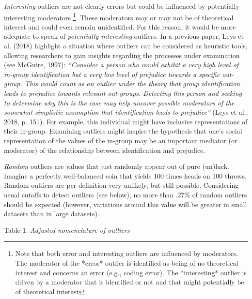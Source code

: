 \documentclass[man,floatsintext]{apa6}
\let\rmarkdownfootnote\footnote%
\def\footnote{\protect\rmarkdownfootnote}
\begin{document}
\emph{Interesting} outliers are not clearly errors but could be influenced by potentially interesting moderators \footnote{Note that both error and interesting outliers are influenced by moderators. The moderator of the *error* outlier is identified as being of no theoretical interest and concerns an error (e.g., coding error). The *interesting* outlier is driven by a moderator that is identified or not and that might potentially be of theoretical interest}. These moderators may or may not be of theoretical interest and could even remain unidentified. For this reason, it would be more adequate to speak of \emph{potentially interesting} outliers. In a previous paper, Leys et al. (2018) highlight a situation where outliers can be considered as heuristic tools, allowing researchers to gain insights regarding the processes under examination (see McGuire, 1997): \emph{\enquote{Consider a person who would exhibit a very high level of in-group identification but a very low level of prejudice towards a specific out-group. This would count as an outlier under the theory that group identification leads to prejudice towards relevant out-groups. Detecting this person and seeking to determine why this is the case may help uncover possible moderators of the somewhat simplistic assumption that identification leads to prejudice}} (Leys et al., 2018, p. 151). For example, this individual might have inclusive representations of their in-group. Examining outliers might inspire the hypothesis that one's social representation of the values of the in-group may be an important mediator (or moderator) of the relationship between identification and prejudice.

\emph{Random} outliers are values that just randomly appear out of pure (un)luck. Imagine a perfectly well-balanced coin that yields 100 times heads on 100 throws. Random outliers are per definition very unlikely, but still possible. Considering usual cutoffs to detect outliers (see below), no more than .27\% of random outliers should be expected (however, variations around this value will be greater in small datasets than in large datasets).

Table 1.
\emph{Adjusted nomenclature of outliers}
\end{document}
